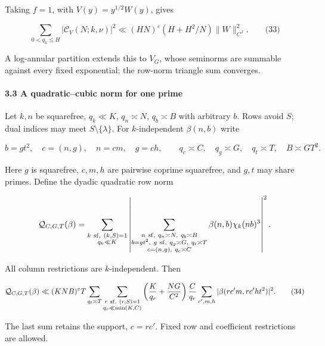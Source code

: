 Taking \(f=1\), with \(V(y)=y^{1/2}W(y)\), gives

\hypertarget{cf:eq:4.4}{}

\label{cf:eq:4.4}

\[
\sum_{0<q_k\le H}|\mathcal C_V(N;k,\nu)|^2\ll(HN)^\varepsilon(H+H^2/N)\|W\|_{C^J}^2.\qquad\text{(33)}
\]

A log-annular partition extends this to \(V_G\), whose seminorms are summable against every fixed exponential; the row-norm triangle sum converges.

\hypertarget{cf:sec:B.3}{}

\label{cf:sec:B.3}

\hypertarget{a-quadraticcubic-norm-for-one-prime}{%
\paragraph{3.3 A quadratic--cubic norm for one prime}\label{a-quadraticcubic-norm-for-one-prime}}

Let \(k,n\) be squarefree, \(q_k\ll K\), \(q_n\asymp N\), \(q_b\asymp B\) with arbitrary \(b\). Rows avoid \(S\); dual indices may meet \(S\setminus\{\lambda\}\). For \(k\)-independent \(\beta(n,b)\) write

\[
b=gt^2,\quad c=(n,g),\quad n=cm,\quad g=ch,
\qquad q_c\asymp C,\quad q_g\asymp G,\quad q_t\asymp T,
\quad B\asymp GT^2.
\]

Here \(g\) is squarefree, \(c,m,h\) are pairwise coprime squarefree, and \(g,t\) may share primes. Define the dyadic quadratic row norm

\[
\mathcal Q_{C,G,T}(\beta)=
\sum_{\substack{k\ {\rm sf},\ (k,S)=1\\q_k\ll K}}
\left|\sum_{\substack{n\ {\rm sf},\ q_n\asymp N,\ q_b\asymp B\\
 b=gt^2,\ g\ {\rm sf},\ q_g\asymp G,\ q_t\asymp T\\
 c=(n,g),\ q_c\asymp C}}
\beta(n,b)\chi_k(nb)^3\right|^2.
\]

All column restrictions are \(k\)-independent. Then

\hypertarget{cf:eq:B.17}{}

\label{cf:eq:B.17}

\[
\mathcal Q_{C,G,T}(\beta)
\ll (KNB)^\varepsilon T
\sum_{q_t\asymp T}\sum_{\substack{r\ {\rm sf},\ (r,S)=1\\q_r\ll\min(K,C)}}
\left(\frac K{q_r}+\frac{NG}{C^2}\right)\frac C{q_r}
\sum_{c',m,h}|\beta(rc'm,rc'ht^2)|^2.
\qquad\text{(34)}
\]

The last sum retains the support, \(c=rc'\). Fixed row and coefficient restrictions are allowed.

